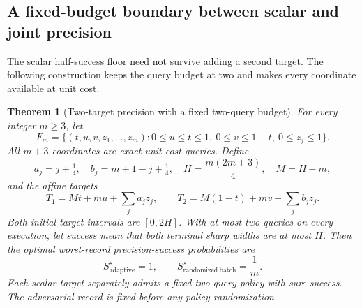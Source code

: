 \documentclass[12pt]{article}
\newtheorem{theorem}{Theorem}
\begin{document}
\subsection{A fixed-budget boundary between scalar and joint precision}
\label{sec:two-target-boundary}
The scalar half-success floor need not survive adding a second target.
The following construction keeps the query budget at two and makes every
coordinate available at unit cost.

\begin{theorem}[Two-target precision with a fixed two-query budget]
\label{thm:two-target-collapse}
For every integer $m\geq3$, let
\[
 F_m=\{(t,u,v,z_1,\ldots,z_m):0\leq u\leq t\leq1,
             \ 0\leq v\leq1-t,\ 0\leq z_j\leq1\}.
\]
All $m+3$ coordinates are exact unit-cost queries. Define
\[
 a_j=j+\tfrac14,\quad b_j=m+1-j+\tfrac14,\quad
 H=\frac{m(2m+3)}4,\quad M=H-m,
\]
and the affine targets
\[
 T_1=Mt+mu+\sum_j a_jz_j,\qquad
 T_2=M(1-t)+mv+\sum_j b_jz_j.
\]
Both initial target intervals are $[0,2H]$. With at most two queries on
every execution, let success mean that both terminal sharp widths are at
most $H$. Then the optimal worst-record precision-success probabilities are
\[
 S^{\star}_{\mathrm{adaptive}}=1,\qquad
 S^{\star}_{\mathrm{randomized\ batch}}=\frac1m.
\]
Each scalar target separately admits a fixed two-query policy with sure
success. The adversarial record is fixed before any policy randomization.
\end{theorem}
\end{document}
